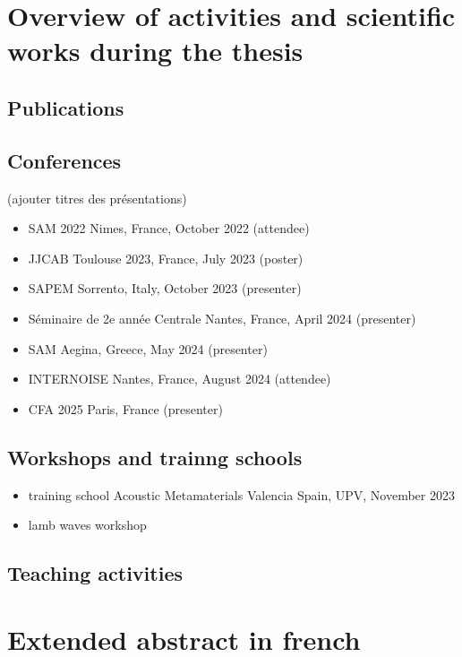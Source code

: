 \newpage
\section{Overview of activities and scientific works during the thesis}
\subsection{Publications}
    \newrefcontext[labelprefix=P]
    \printbibliography[heading=none,env=mespublis,keyword=mespapiers]
    \endrefcontext
\subsection{Conferences} 
(ajouter titres des présentations)
\begin{itemize}
    \item SAM 2022 Nimes, France, October 2022 (attendee)
    \item JJCAB Toulouse 2023, France, July 2023 (poster)
    \item SAPEM Sorrento, Italy, October 2023 (presenter)
    \item Séminaire de 2e année Centrale Nantes, France, April 2024 (presenter)
    \item SAM Aegina, Greece, May 2024 (presenter)
    \item INTERNOISE Nantes, France, August 2024 (attendee)
    \item CFA 2025 Paris, France (presenter)  
\end{itemize}

\subsection{Workshops and trainng schools}
\begin{itemize}
    \item training school Acoustic Metamaterials Valencia Spain, UPV, November 2023
    \item lamb waves workshop
\end{itemize}


\subsection{Teaching activities}

\newpage
\section{Extended abstract in french}